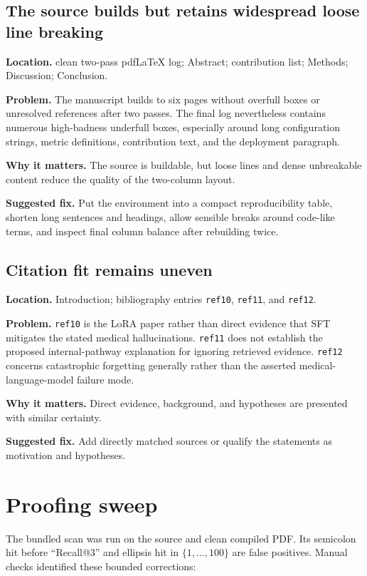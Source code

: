 \documentclass[11pt]{article}
\newcommand{\findinglabel}[1]{\textbf{#1}}
\begin{document}
\subsection*{The source builds but retains widespread loose line breaking}

\findinglabel{Location.} clean two-pass pdfLaTeX log; Abstract; contribution list; Methods; Discussion; Conclusion.

\findinglabel{Problem.} The manuscript builds to six pages without overfull boxes or unresolved references after two passes.  The final log nevertheless contains numerous high-badness underfull boxes, especially around long configuration strings, metric definitions, contribution text, and the deployment paragraph.

\findinglabel{Why it matters.} The source is buildable, but loose lines and dense unbreakable content reduce the quality of the two-column layout.

\findinglabel{Suggested fix.} Put the environment into a compact reproducibility table, shorten long sentences and headings, allow sensible breaks around code-like terms, and inspect final column balance after rebuilding twice.

\subsection*{Citation fit remains uneven}

\findinglabel{Location.} Introduction; bibliography entries \texttt{ref10}, \texttt{ref11}, and \texttt{ref12}.

\findinglabel{Problem.} \texttt{ref10} is the LoRA paper rather than direct evidence that SFT mitigates the stated medical hallucinations.  \texttt{ref11} does not establish the proposed internal-pathway explanation for ignoring retrieved evidence.  \texttt{ref12} concerns catastrophic forgetting generally rather than the asserted medical-language-model failure mode.

\findinglabel{Why it matters.} Direct evidence, background, and hypotheses are presented with similar certainty.

\findinglabel{Suggested fix.} Add directly matched sources or qualify the statements as motivation and hypotheses.

\section*{Proofing sweep}

The bundled scan was run on the source and clean compiled PDF.  Its semicolon hit before ``Recall@3'' and ellipsis hit in $\{1,\ldots,100\}$ are false positives.  Manual checks identified these bounded corrections:
\end{document}
